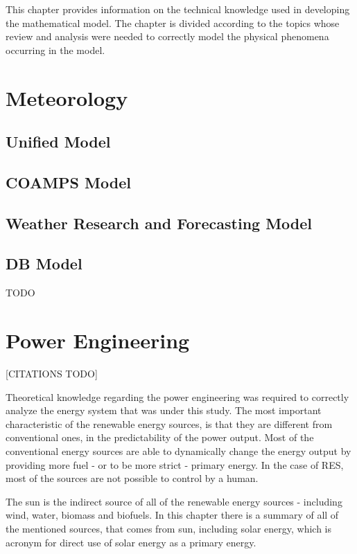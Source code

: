 This chapter provides information on the technical knowledge used in developing the mathematical model.
The chapter is divided according to the topics whose review and analysis were needed
to correctly model the physical phenomena occurring in the model.

\section{Meteorology}

\subsection{Unified Model}

\subsection{COAMPS Model}

\subsection{Weather Research and Forecasting Model}

\subsection{DB Model}

TODO



\section{Power Engineering}

[CITATIONS TODO]

Theoretical knowledge regarding the power engineering was required to correctly
analyze the energy system that was under this study. The most important 
characteristic of the renewable energy sources, is that they are different
from conventional ones, in the predictability 
of the power output. Most of the conventional energy sources are able to dynamically 
change the energy output by providing more fuel - or to be more strict - primary energy.
In the case of RES, most of the sources are not possible to control by a human.

The sun is the indirect source of all of the renewable energy sources - including wind, water, biomass
and biofuels. In this chapter there is a summary of all of the mentioned sources, that comes from sun, including
solar energy, which is acronym for direct use of solar energy as a primary energy.

